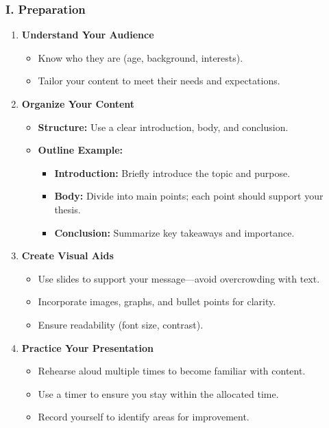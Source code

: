 \documentclass[aspectratio=169]{beamer}
\begin{document}
\begin{frame}[fragile]
    \frametitle{I. Preparation}
    \begin{enumerate}
        \item \textbf{Understand Your Audience}
        \begin{itemize}
            \item Know who they are (age, background, interests).
            \item Tailor your content to meet their needs and expectations.
        \end{itemize}

        \item \textbf{Organize Your Content}
        \begin{itemize}
            \item \textbf{Structure:} Use a clear introduction, body, and conclusion.
            \item \textbf{Outline Example:}
            \begin{itemize}
                \item \textbf{Introduction:} Briefly introduce the topic and purpose.
                \item \textbf{Body:} Divide into main points; each point should support your thesis.
                \item \textbf{Conclusion:} Summarize key takeaways and importance.
            \end{itemize}
        \end{itemize}
        
        \item \textbf{Create Visual Aids}
        \begin{itemize}
            \item Use slides to support your message—avoid overcrowding with text.
            \item Incorporate images, graphs, and bullet points for clarity.
            \item Ensure readability (font size, contrast).
        \end{itemize}
        
        \item \textbf{Practice Your Presentation}
        \begin{itemize}
            \item Rehearse aloud multiple times to become familiar with content.
            \item Use a timer to ensure you stay within the allocated time.
            \item Record yourself to identify areas for improvement.
        \end{itemize}
    \end{enumerate}
\end{frame}
\end{document}
